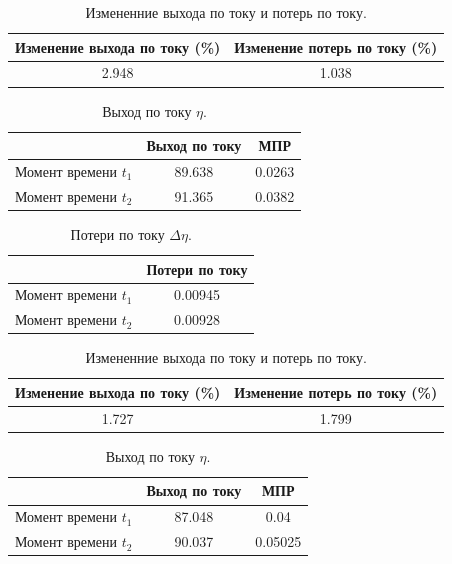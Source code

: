 \documentclass{article}
\begin{document}
\begin{table}[ht]
\centering
\begin{tabular}{|c|c|}
\hline
Изменение выхода по току (\%)	& Изменение потерь по току (\%) \\
\hline
2.948 & 1.038\\ 
\hline
\end{tabular}
\caption{Измененние выхода по току и потерь по току.}
\end{table}




\begin{table}[ht]
\centering
\begin{tabular}{|c|c|c|}
\hline
			&Выход по току	& МПР\\ 
\hline
Момент времени $t_1$		&89.638	& 0.0263\\  
Момент времени $t_2$		&91.365	& 0.0382\\  
\hline
\end{tabular}
\caption{Выход по току $\eta$.}
\end{table}

\begin{table}[ht]
\centering
\begin{tabular}{|c|c|}
\hline
			&Потери по току	\\
\hline
Момент времени $t_1$		&0.00945\\
Момент времени $t_2$		&0.00928\\  
\hline
\end{tabular}
\caption{Потери по току $\Delta \eta$.}
\end{table}

\begin{table}[ht]
\centering
\begin{tabular}{|c|c|}
\hline
Изменение выхода по току (\%)	& Изменение потерь по току (\%) \\
\hline
1.727 & 1.799\\ 
\hline
\end{tabular}
\caption{Измененние выхода по току и потерь по току.}
\end{table}




\begin{table}[ht]
\centering
\begin{tabular}{|c|c|c|}
\hline
			&Выход по току	& МПР\\
\hline
Момент времени $t_1$	&87.048	& 0.04\\  
Момент времени $t_2$	&90.037	& 0.05025	\\  
\hline
\end{tabular}
\caption{Выход по току $\eta$.}
\end{table}
	
\end{document}
